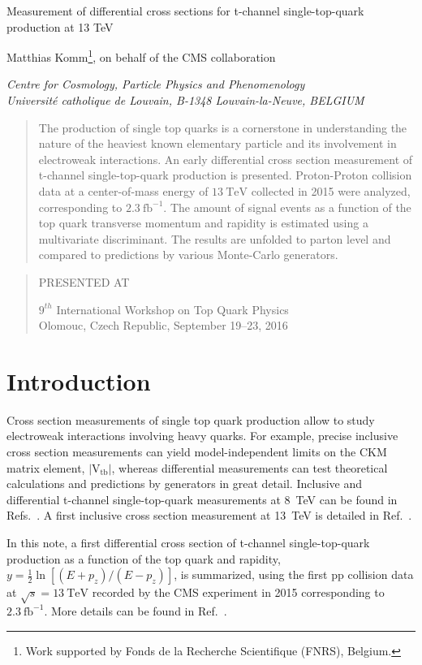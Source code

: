 \documentclass[12pt]{article}
\newcommand\pubnumber{}%
\newcommand\pubdate{\today}
\def\institute{Centre for Cosmology, Particle Physics and Phenomenology\\
Universit\'e catholique de Louvain, B-1348 Louvain-la-Neuve, BELGIUM}
\def\support{\footnote{Work supported by Fonds de la Recherche Scientifique (FNRS), Belgium.}}
\def\Title#1{\begin{center} {\Large #1 } \end{center}}
\def\Author#1{\begin{center}{ \sc #1} \end{center}}
\def\Address#1{\begin{center}{ \it #1} \end{center}}
\newcommand\pubblock{\rightline{\begin{tabular}{l} \pubnumber\\
         \pubdate  \end{tabular}}}
\newenvironment{Abstract}{\begin{quotation}  }{\end{quotation}}
\newenvironment{Presented}{\begin{quotation} \begin{center} 
             PRESENTED AT\end{center}\bigskip 
      \begin{center}\begin{large}}{\end{large}\end{center} \end{quotation}}
\begin{document}
\begin{titlepage}
\pubblock

\vfill
\Title{Measurement of differential cross sections for t-channel single-top-quark production at 13 TeV}
\vfill
\Author{ Matthias Komm\support, on behalf of the CMS collaboration}
\Address{\institute}
\vfill
\begin{Abstract}
The production of single top quarks is a cornerstone in understanding the nature of the heaviest known elementary particle and its involvement in electroweak interactions. An early differential cross section measurement of t-channel single-top-quark production is presented. Proton-Proton collision data at a center-of-mass energy of $13~\mathrm{TeV}$ collected in 2015 were analyzed, corresponding to $2.3~\mathrm{fb}^{-1}$. The amount of signal events as a function of the top quark transverse momentum and rapidity is estimated using a multivariate discriminant. The results are unfolded to parton level and compared to predictions by various Monte-Carlo generators.
\end{Abstract}
\vfill
\begin{Presented}
$9^{th}$ International Workshop on Top Quark Physics\\
Olomouc, Czech Republic,  September 19--23, 2016
\end{Presented}
\vfill
\end{titlepage}
\def\thefootnote{\fnsymbol{footnote}}
\setcounter{footnote}{0}
%

\section{Introduction}

Cross section measurements of single top quark production allow to study electroweak interactions involving heavy quarks. For example, precise inclusive cross section measurements can yield model-independent limits on the CKM matrix element, $|\mathrm{V}_\mathrm{tb}|$, whereas differential measurements can test theoretical calculations and predictions by generators in great detail. Inclusive and differential t-channel single-top-quark measurements at 8~TeV can be found in Refs.~\cite{Vtb,TOP-14-004}. A first inclusive cross section measurement at 13~TeV is detailed in Ref.~\cite{TOP-16-003}.

In this note, a first differential cross section of t-channel single-top-quark production as a function of the top quark \pt and rapidity, $y=\frac{1}{2}\ln[(E+p_{z})/(E-p_{z})]$, is summarized, using the first pp collision data at $\sqrt{s}=13~\mathrm{TeV}$ recorded by the CMS experiment in 2015 corresponding to $2.3~\mathrm{fb}^{-1}$. More details can be found in Ref.~\cite{TOP-16-004}.
\end{document}
